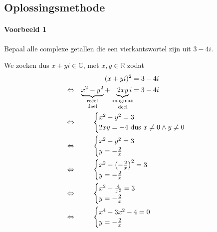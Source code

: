 \documentclass[12pt,twoside]{article}
\begin{document}
\subsection{Oplossingsmethode}

\paragraph*{Voorbeeld 1}
Bepaal alle complexe getallen die een vierkantswortel zijn uit $3-4i$.

We zoeken dus $x+yi \in \mathbb{C}$, met $x,y\in\mathbb{R}$ zodat
\begin{align*}
  &&(x+yi)^2 &= 3-4i\\
  \LRA &&\underbrace{x^2 - y^2}_{\text{\shortstack{reëel\\deel}}} + \underbrace{2xy}_{\text{\shortstack{imaginair\\deel}}}\hspace*{-0.3cm}i &= 3-4i\\
  \LRA && &\hspace*{-2cm}\begin{cases}x^2 - y^2 = 3\\2xy =  -4 \mbox{ dus } x\neq 0 \wedge y\neq 0 \end{cases}\\
  \LRA && &\hspace*{-2cm}\begin{cases}x^2 - y^2 = 3\\y =  -\frac{2}{x}\end{cases}\\
  \LRA && &\hspace*{-2cm}\begin{cases}x^2 - \left(-\frac{2}{x}\right)^2 = 3\\y =  -\frac{2}{x}\end{cases}\\
  \LRA && &\hspace*{-2cm}\begin{cases}x^2 - \frac{4}{x^2} = 3\\y =  -\frac{2}{x}\end{cases}\\
  \LRA && &\hspace*{-2cm}\begin{cases}x^4-3x^2-4=0\\y =  -\frac{2}{x}\end{cases}
\end{align*}
\end{document}
